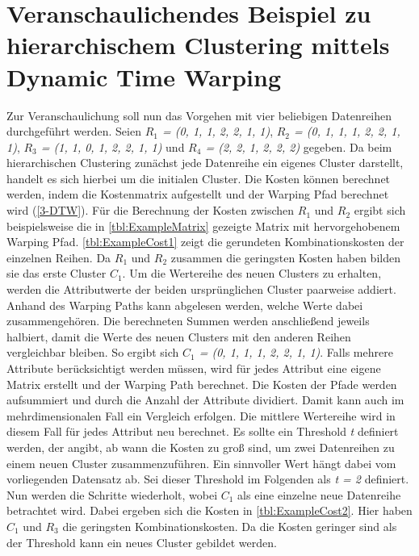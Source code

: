 \section{Veranschaulichendes Beispiel zu hierarchischem Clustering mittels Dynamic Time Warping}
\label{3-Example}
Zur Veranschaulichung soll nun das Vorgehen mit vier beliebigen Datenreihen durchgeführt werden.
Seien \emph{$R_{1}$ = (0, 1, 1, 2, 2, 1, 1)}, \emph{$R_{2}$ = (0, 1, 1, 1, 2, 2, 1, 1)},
\emph{$R_{3}$ = (1, 1, 0, 1, 2, 2, 1, 1)} und \emph{$R_{4}$ = (2, 2, 1, 2, 2, 2)} gegeben.
Da beim hierarchischen Clustering zunächst jede Datenreihe ein eigenes Cluster darstellt,
handelt es sich hierbei um die initialen Cluster.
Die Kosten können berechnet werden, indem die Kostenmatrix aufgestellt und der Warping Pfad berechnet wird (\autoref{3-DTW}).
Für die Berechnung der Kosten zwischen \emph{$R_{1}$} und \emph{$R_{2}$} ergibt sich beispielsweise
die in \autoref{tbl:ExampleMatrix} gezeigte Matrix
mit hervorgehobenem Warping Pfad.
\autoref{tbl:ExampleCost1} zeigt die gerundeten Kombinationskosten der einzelnen Reihen.
Da \emph{$R_{1}$} und \emph{$R_{2}$} zusammen die geringsten Kosten haben bilden sie das erste Cluster \emph{$C_{1}$}.
Um die Wertereihe des neuen Clusters zu erhalten, werden die Attributwerte der beiden ursprünglichen Cluster paarweise addiert.
Anhand des Warping Paths kann abgelesen werden, welche Werte dabei zusammengehören.
Die berechneten Summen werden anschließend jeweils halbiert, damit die Werte des neuen Clusters mit den anderen Reihen vergleichbar bleiben.
So ergibt sich \emph{$C_{1}$ = (0, 1, 1, 1, 2, 2, 1, 1)}.
Falls mehrere Attribute berücksichtigt werden müssen,
wird für jedes Attribut eine eigene Matrix erstellt und der Warping Path berechnet.
Die Kosten der Pfade werden aufsummiert und durch die Anzahl der Attribute dividiert.
Damit kann auch im mehrdimensionalen Fall ein Vergleich erfolgen.
Die mittlere Wertereihe wird in diesem Fall für jedes Attribut neu berechnet.
Es sollte ein Threshold \emph{t} definiert werden,
der angibt, ab wann die Kosten zu groß sind, um zwei Datenreihen zu einem neuen Cluster zusammenzuführen.
Ein sinnvoller Wert hängt dabei vom vorliegenden Datensatz ab.
Sei dieser Threshold im Folgenden als \emph{t = 2} definiert.
Nun werden die Schritte wiederholt, wobei \emph{$C_{1}$} als eine einzelne neue Datenreihe betrachtet wird.
Dabei ergeben sich die Kosten in \autoref{tbl:ExampleCost2}.
Hier haben \emph{$C_{1}$} und \emph{$R_{3}$} die geringsten Kombinationskosten.
Da die Kosten geringer sind als der Threshold kann ein neues Cluster gebildet werden.
